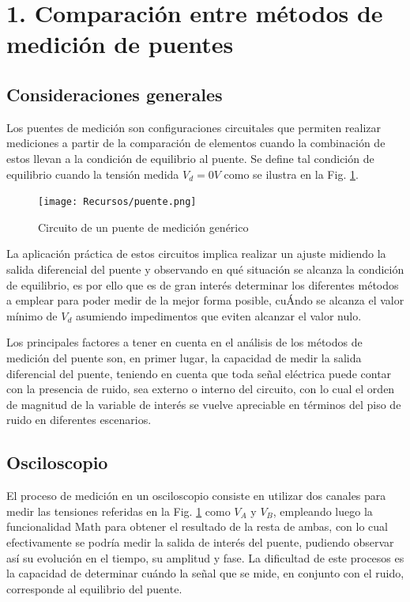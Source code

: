 \section{1. Comparaci\'on entre m\'etodos de medici\'on de puentes}

\subsection{Consideraciones generales}
Los puentes de medici\'on son configuraciones circuitales que permiten realizar mediciones a partir de la comparaci\'on de elementos cuando la combinaci\'on de estos
llevan a la condici\'on de equilibrio al puente. Se define tal condici\'on de equilibrio cuando la tensi\'on medida $V_d = 0V$ como se ilustra en la Fig. \ref{fig:puente_de_medicion}.

\begin{figure}[H]
    \centering
    \texttt{[image: Recursos/puente.png]}
    \caption{Circuito de un puente de medici\'on gen\'erico}
    \label{fig:puente_de_medicion}
\end{figure}

La aplicaci\'on pr\'actica de estos circuitos implica realizar un ajuste midiendo la salida diferencial del puente y observando en qu\'e situaci\'on se alcanza la condici\'on de equilibrio, es por ello
que es de gran inter\'es determinar los diferentes m\'etodos a emplear para poder medir de la mejor forma posible, cu\'Ando se alcanza el valor m\'inimo de $V_d$ asumiendo impedimentos que eviten alcanzar el valor nulo.

Los principales factores a tener en cuenta en el an\'alisis de los m\'etodos de medici\'on del puente son, en primer lugar, la capacidad de medir la salida diferencial del puente, teniendo en cuenta que toda se\~nal el\'ectrica
puede contar con la presencia de ruido, sea externo o interno del circuito, con lo cual el orden de magnitud de la variable de inter\'es se vuelve apreciable en t\'erminos del piso de ruido en diferentes escenarios.

\subsection{Osciloscopio}
El proceso de medici\'on en un osciloscopio consiste en utilizar dos canales para medir las tensiones referidas en la Fig. \ref{fig:puente_de_medicion} como $V_A$ y $V_B$, empleando luego la funcionalidad Math para obtener el resultado
de la resta de ambas, con lo cual efectivamente se podr\'ia medir la salida de inter\'es del puente, pudiendo observar as\'i su evoluci\'on en el tiempo, su amplitud y fase. La dificultad de este procesos es la capacidad de determinar cu\'ando la se\~nal que se mide,
en conjunto con el ruido, corresponde al equilibrio del puente.

